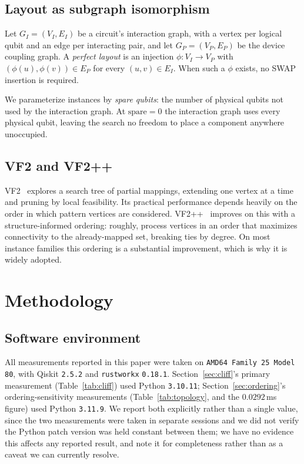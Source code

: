 \documentclass[11pt]{article}
\begin{document}
\subsection{Layout as subgraph isomorphism}

Let $G_I = (V_I, E_I)$ be a circuit's interaction graph, with a vertex
per logical qubit and an edge per interacting pair, and let
$G_P = (V_P, E_P)$ be the device coupling graph. A \emph{perfect
layout} is an injection $\phi : V_I \to V_P$ with
$(\phi(u), \phi(v)) \in E_P$ for every $(u,v) \in E_I$. When such a
$\phi$ exists, no SWAP insertion is required.

We parameterize instances by \emph{spare qubits}: the number of
physical qubits not used by the interaction graph. At
$\mathrm{spare}=0$ the interaction graph uses every physical qubit,
leaving the search no freedom to place a component anywhere unoccupied.

\subsection{VF2 and VF2++}

VF2~\cite{vf2} explores a search tree of partial mappings, extending
one vertex at a time and pruning by local feasibility. Its practical
performance depends heavily on the order in which pattern vertices are
considered. VF2++~\cite{vf2pp} improves on this with a
structure-informed ordering: roughly, process vertices in an order that
maximizes connectivity to the already-mapped set, breaking ties by
degree. On most instance families this ordering is a substantial
improvement, which is why it is widely adopted.

\section{Methodology}
\label{sec:method}

\subsection{Software environment}

All measurements reported in this paper were taken on
\texttt{AMD64 Family 25 Model 80}, with Qiskit \texttt{2.5.2} and
\texttt{rustworkx} \texttt{0.18.1}. Section~\ref{sec:cliff}'s primary
measurement (Table~\ref{tab:cliff}) used Python \texttt{3.10.11};
Section~\ref{sec:ordering}'s ordering-sensitivity measurements
(Table~\ref{tab:topology}, and the $0.0292$\,ms figure) used Python
\texttt{3.11.9}. We report both explicitly rather than a single value,
since the two measurements were taken in separate sessions and we did
not verify the Python patch version was held constant between them; we
have no evidence this affects any reported result, and note it for
completeness rather than as a caveat we can currently resolve.
\end{document}
